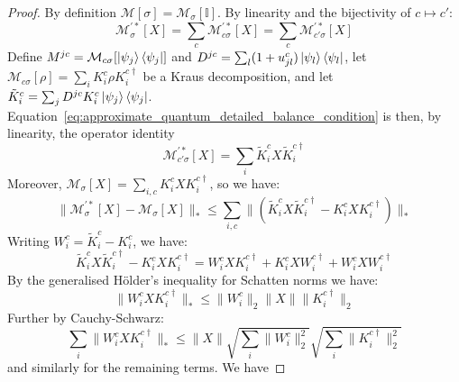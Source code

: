 \begin{proof}
 By definition $\mathcal{M}[\sigma]=\mathcal{M}_{\sigma}[\mathbb{I}]$. By linearity and the bijectivity of $c \mapsto c'$:
    \begin{equation}
        \mathcal{M}^{\prime *}_{\sigma}[X] = \sum_{c}\mathcal{M}^{\prime *}_{c\sigma}[X] = \sum_{c}\mathcal{M}^{\prime *}_{c'\sigma}[X]
    \end{equation}
    Define $M^{jc} = \mathcal{M}_{c\sigma}[\ket{\psi_j}\bra{\psi_j}]$ and $D^{jc}=\sum_l(1+u_{jl}^{c})\ket{\psi_l}\bra{\psi_l}$, let $\mathcal{M}_{c\sigma}[\rho]=\sum_i K^c_i\rho K^{c\dagger}_i$ be a Kraus decomposition, and let $\tilde K^c_i=\sum_j D^{jc}K^c_i\ket{\psi_j}\bra{\psi_j}$. Equation~\eqref{eq:approximate_quantum_detailed_balance_condition} is then, by linearity, the operator identity
    \begin{equation}
        \mathcal{M}^{\prime *}_{c'\sigma}[X]=\sum_i\tilde K^c_iX\tilde K^{c\dagger}_i
    \end{equation}
    Moreover, $\mathcal{M}_{\sigma}[X] = \sum_{i,c}K^c_iXK^{c\dagger}_i$, so we have:
    \begin{equation}
        \|\mathcal{M}^{\prime *}_{\sigma}[X]-\mathcal{M}_\sigma[X]\|_* \leq \sum_{i,c}\Big\|\left(\tilde K^c_iX\tilde K^{c\dagger}_i-K^c_iXK^{c\dagger}_i\right)\Big\|_*
    \end{equation}
    Writing $W^c_i=\tilde K^c_i-K^c_i$, we have:
    \begin{equation}
        \tilde K^c_iX\tilde K^{c\dagger}_i-K^c_iXK^{c\dagger}_i = W^c_iXK^{c\dagger}_i + K^c_iXW^{c\dagger}_i + W^c_iXW^{c\dagger}_i
    \end{equation}
    By the generalised H\"older's inequality for Schatten norms we have:
    \begin{equation}
        \Big\|W^c_iXK^{c\dagger}_i\Big\|_* \leq \|W^c_i\|_2\|X\| \|K^{c\dagger}_i\|_2
    \end{equation}
    Further by Cauchy-Schwarz:
    \begin{equation}
        \sum_i\Big\|W^c_iXK^{c\dagger}_i\Big\|_* \leq \|X\| \sqrt{\sum_i \|W^c_i \|^2_2}\sqrt{\sum_i \|K_i^{c\dagger}\|^2_2}
    \end{equation}
    and similarly for the remaining terms. We have 
    

\end{proof}
